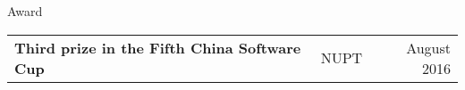 \documentclass{resume} %
\begin{document}


\begin{rSection}{Award}

\begin{tabu} to 
Third prize in the Fifth China Software Cup & NUPT & August 2016
\end{tabu}

\end{rSection}


%
%







\end{document}
